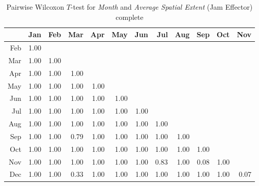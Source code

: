     \begin{table}[ht!]
        \tiny
        \centering
        \begin{tabular}{rrrrrrrrrrrr}
            \toprule
                & Jan & Feb & Mar & Apr & May & Jun & Jul & Aug & Sep & Oct & Nov \\ 
            \midrule
            Feb & 1.00 &  &  &  &  &  &  &  &  &  &  \\ 
            Mar & 1.00 & 1.00 &  &  &  &  &  &  &  &  &  \\ 
            Apr & 1.00 & 1.00 & 1.00 &  &  &  &  &  &  &  &  \\ 
            May & 1.00 & 1.00 & 1.00 & 1.00 &  &  &  &  &  &  &  \\ 
            Jun & 1.00 & 1.00 & 1.00 & 1.00 & 1.00 &  &  &  &  &  &  \\ 
            Jul & 1.00 & 1.00 & 1.00 & 1.00 & 1.00 & 1.00 &  &  &  &  &  \\ 
            Aug & 1.00 & 1.00 & 1.00 & 1.00 & 1.00 & 1.00 & 1.00 &  &  &  &  \\ 
            Sep & 1.00 & 1.00 & 0.79 & 1.00 & 1.00 & 1.00 & 1.00 & 1.00 &  &  &  \\ 
            Oct & 1.00 & 1.00 & 1.00 & 1.00 & 1.00 & 1.00 & 1.00 & 1.00 & 1.00 &  &  \\ 
            Nov & 1.00 & 1.00 & 1.00 & 1.00 & 1.00 & 1.00 & 0.83 & 1.00 & 0.08 & 1.00 &  \\ 
            Dec & 1.00 & 1.00 & 0.33 & 1.00 & 1.00 & 1.00 & 1.00 & 1.00 & 1.00 & 1.00 & 0.07 \\ 
            \bottomrule
        \end{tabular}
        \caption{Pairwise Wilcoxon $T$-test for \textit{Month} and \textit{Average Spatial Extent} (Jam Effector) complete}
        \label{tbl:wilcoxon_baysis_effector_Month_SAvg}
    \end{table}
    
